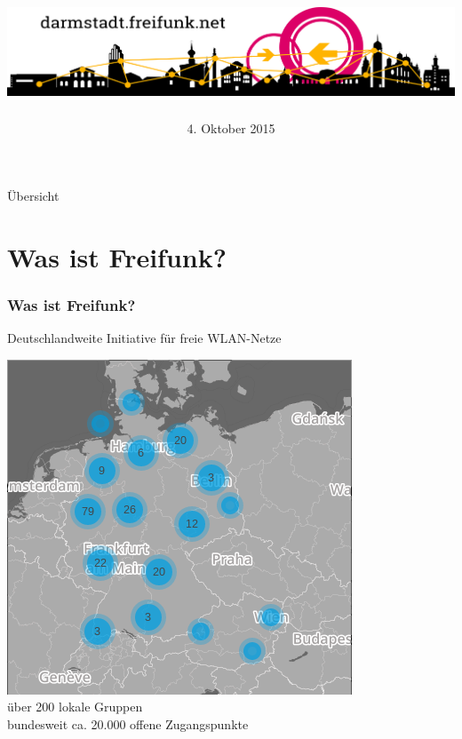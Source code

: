 \documentclass[10pt]{beamer}
\title{\centering\includegraphics[width=\textwidth]{images/logo-skyline}}
\author{}
\date{\footnotesize 4. Oktober 2015}
\begin{document}
\begin{frame}
\maketitle
\end{frame}


\begin{frame}{Übersicht}
\tableofcontents
\end{frame}

\section{Was ist Freifunk?}
\begin{frame}
	\frametitle{Was ist Freifunk?}

	Deutschlandweite Initiative für freie WLAN-Netze
	
	\pause
	\vfill
	\centering
	\includegraphics[scale=0.3]{images/2015-10_freifunk-map} \\
	über 200 lokale Gruppen\\bundesweit ca. 20.000 offene Zugangspunkte

	
\end{frame}
\end{document}
